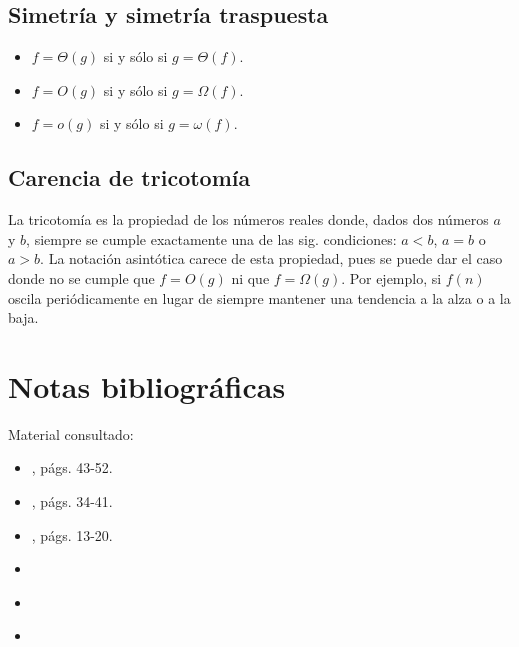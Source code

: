 \subsection{Simetría y simetría traspuesta}

\begin{itemize}
    \item $f=\Theta(g)$ si y sólo si $g=\Theta(f)$.
    \item $f=O(g)$ si y sólo si $g=\Omega(f)$.
    \item $f=o(g)$ si y sólo si $g=\omega(f)$.
\end{itemize}

\subsection{Carencia de tricotomía}

La tricotomía es la propiedad de los números reales donde, dados dos
números $a$ y $b$, siempre se cumple exactamente una de las sig.
condiciones: $a<b$, $a=b$ o $a>b$. La notación asintótica carece
de esta propiedad, pues se puede dar el caso donde no se cumple
que $f=O(g)$ ni que $f=\Omega(g)$. Por ejemplo, si $f(n)$ oscila
periódicamente en lugar de siempre mantener una tendencia a la alza
o a la baja.

\section*{Notas bibliográficas}

Material consultado:
\begin{itemize}
    \item \textcite{cormen_introduction_2009}, págs. 43-52.
    \item \textcite{skiena_algorithm_2012}, págs. 34-41.
    \item \textcite{goodrich_algorithm_2001}, págs. 13-20.
    \item \textcite{baker_2013}
    \item \textcite{leighton_and_rubinfeld_2004}
    \item \textcite{tomescu_2014}
\end{itemize}
